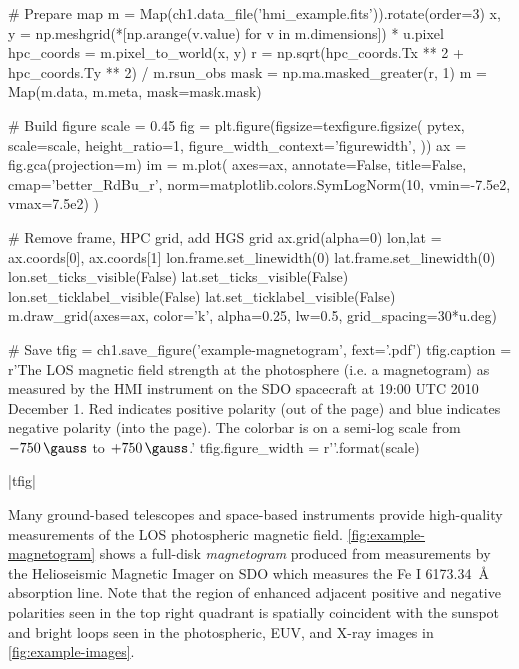 \begin{pycode}[chapter1]
# Prepare map
m = Map(ch1.data_file('hmi_example.fits')).rotate(order=3)
x, y = np.meshgrid(*[np.arange(v.value) for v in m.dimensions]) * u.pixel
hpc_coords = m.pixel_to_world(x, y)
r = np.sqrt(hpc_coords.Tx ** 2 + hpc_coords.Ty ** 2) / m.rsun_obs
mask = np.ma.masked_greater(r, 1)
m = Map(m.data, m.meta, mask=mask.mask)

# Build figure
scale = 0.45
fig = plt.figure(figsize=texfigure.figsize(
    pytex,
    scale=scale,
    height_ratio=1,
    figure_width_context='figurewidth',
))
ax = fig.gca(projection=m)
im = m.plot(
    axes=ax,
    annotate=False,
    title=False,
    cmap='better_RdBu_r',
    norm=matplotlib.colors.SymLogNorm(10, vmin=-7.5e2, vmax=7.5e2)
)

# Remove frame, HPC grid, add HGS grid
ax.grid(alpha=0)
lon,lat = ax.coords[0], ax.coords[1]
lon.frame.set_linewidth(0)
lat.frame.set_linewidth(0)
lon.set_ticks_visible(False)
lat.set_ticks_visible(False)
lon.set_ticklabel_visible(False)
lat.set_ticklabel_visible(False)
m.draw_grid(axes=ax, color='k', alpha=0.25, lw=0.5, grid_spacing=30*u.deg)

# Save
tfig = ch1.save_figure('example-magnetogram', fext='.pdf')
tfig.caption = r'The LOS magnetic field strength at the photosphere (i.e. a magnetogram) as measured by the HMI instrument on the SDO spacecraft at 19:00 UTC 2010 December 1. Red indicates positive polarity (out of the page) and blue indicates negative polarity (into the page). The colorbar is on a semi-log scale from $-\SI{750}{\gauss}$ to $+\SI{750}{\gauss}$.'
tfig.figure_width = r'{}\textwidth'.format(scale)
\end{pycode}
\py[chapter1]|tfig|

Many ground-based telescopes \citep[e.g. GONG, Mt. Wilson,][]{howard_mount_1976} and space-based instruments \citep[e.g. SOHO/MDI,][]{scherrer_solar_1995} provide high-quality measurements of the LOS photospheric magnetic field. \autoref{fig:example-magnetogram} shows a full-disk \textit{magnetogram} produced from measurements by the Helioseismic Magnetic Imager \citep[HMI,][]{hoeksema_helioseismic_2014} on SDO which measures the Fe I \SI{6173.34}{\angstrom} absorption line. Note that the region of enhanced adjacent positive and negative polarities seen in the top right quadrant is spatially coincident with the sunspot and bright loops seen in the photospheric, EUV, and X-ray images in \autoref{fig:example-images}.

